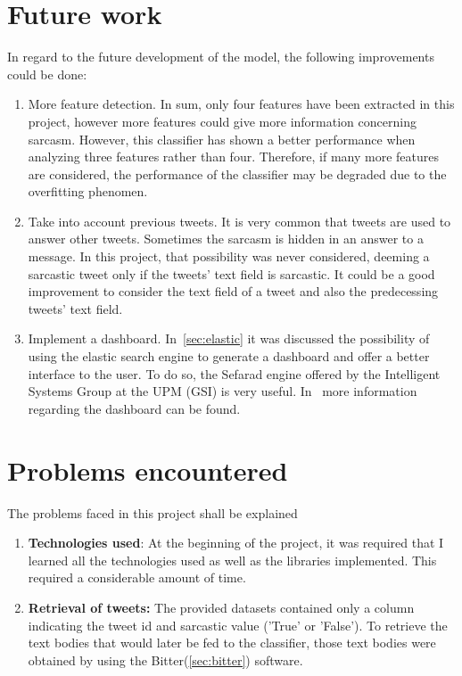 \section{Future work}
In regard to the future development of the model, the following improvements could be done:
\begin{enumerate}
	\item More feature detection. In sum, only four features have been extracted in this project, however more features could give more information concerning sarcasm. However, this classifier has shown a better performance when analyzing three features rather than four. Therefore, if many more features are considered, the performance of the classifier may be degraded due to the overfitting phenomen.
	\item Take into account previous tweets. It is very common that tweets are used to answer other tweets. Sometimes the sarcasm is hidden in an answer to a message. In this project, that possibility was never considered, deeming a sarcastic tweet only if the tweets' text field is sarcastic. It could be a good improvement to consider the text field of a tweet and also the predecessing tweets' text field.
	\item Implement a dashboard. In~\cref{sec:elastic} it was discussed the possibility of using the elastic search engine to generate a dashboard and offer a better interface to the user. To do so, the Sefarad engine offered by the Intelligent Systems Group at the UPM (GSI) is very useful. In~\cite{sefarad} more information regarding the dashboard can be found.
\end{enumerate}
\section{Problems encountered}
The problems faced in this project shall be explained
\begin{enumerate}
	\item \textbf{Technologies used}: At the beginning of the project, it was required that I learned all the technologies used as well as the libraries implemented. This required a considerable amount of time.
	\item \textbf{Retrieval of tweets:} The provided datasets contained only a column indicating the tweet id and sarcastic value ('True' or 'False'). To retrieve the text bodies that would later be fed to the classifier, those text bodies were obtained by using the Bitter(\cref{sec:bitter}) software. 
	
\end{enumerate}


